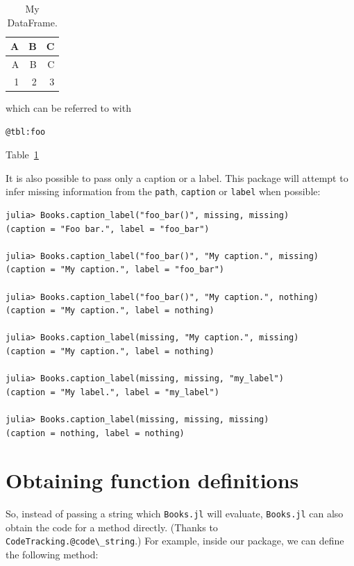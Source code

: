 \documentclass[
  14pt
  american,
  paper=a4,
  ,captions=tableheading
]{scrreprt}
\newcommand{\passthrough}[1]{#1}
\renewenvironment{quote}{\begin{customblockquote}\list{}{\rightmargin=0em\leftmargin=0em}%
\item\relax\color{blockquote-text}\ignorespaces}{\unskip\unskip\endlist\end{customblockquote}}
\begin{document}
\hypertarget{tbl:foo}{}
\begin{longtable}[]{@{}rrr@{}}
\caption{\label{tbl:foo}My DataFrame.}\tabularnewline
\toprule
A & B & C \\
\midrule
\endfirsthead
\toprule
A & B & C \\
\midrule
\endhead
1 & 2 & 3 \\
\bottomrule
\end{longtable}

which can be referred to with

\begin{lstlisting}
@tbl:foo
\end{lstlisting}

\begin{quote}
Table~\ref{tbl:foo}
\end{quote}

It is also possible to pass only a caption or a label. This package will
attempt to infer missing information from the
\passthrough{\lstinline!path!}, \passthrough{\lstinline!caption!} or
\passthrough{\lstinline!label!} when possible:

\begin{lstlisting}
julia> Books.caption_label("foo_bar()", missing, missing)
(caption = "Foo bar.", label = "foo_bar")

julia> Books.caption_label("foo_bar()", "My caption.", missing)
(caption = "My caption.", label = "foo_bar")

julia> Books.caption_label("foo_bar()", "My caption.", nothing)
(caption = "My caption.", label = nothing)

julia> Books.caption_label(missing, "My caption.", missing)
(caption = "My caption.", label = nothing)

julia> Books.caption_label(missing, missing, "my_label")
(caption = "My label.", label = "my_label")

julia> Books.caption_label(missing, missing, missing)
(caption = nothing, label = nothing)
\end{lstlisting}

\hypertarget{sec:function_code_blocks}{%
\section{Obtaining function
definitions}\label{sec:function_code_blocks}}

So, instead of passing a string which \passthrough{\lstinline!Books.jl!}
will evaluate, \passthrough{\lstinline!Books.jl!} can also obtain the
code for a method directly. (Thanks to
\passthrough{\lstinline!CodeTracking.@code\_string!}.) For example,
inside our package, we can define the following method:
\end{document}
